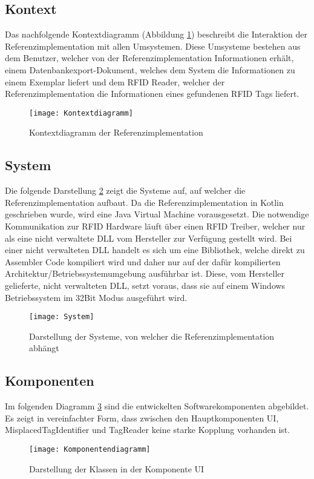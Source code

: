\subsection{Kontext}
Das nachfolgende Kontextdiagramm (Abbildung \ref{fig:Kontextdiagramm}) beschreibt die Interaktion der Referenzimplementation mit allen Umsystemen. Diese Umsysteme bestehen aus dem Benutzer, welcher von der Referenzimplementation Informationen erhält, einem Datenbankexport-Dokument, welches dem System die Informationen zu einem Exemplar liefert und dem RFID Reader, welcher der Referenzimplementation die Informationen eines gefundenen RFID Tags liefert.
\begin{figure}[htb]
	\centering
	\texttt{[image: Kontextdiagramm]}
	\caption{Kontextdiagramm der Referenzimplementation}
	\label{fig:Kontextdiagramm}
\end{figure}

\subsection{System}
Die folgende Darstellung \ref{fig:System} zeigt die Systeme auf, auf welcher die Referenzimplementation aufbaut.
Da die Referenzimplementation in Kotlin geschrieben wurde, wird eine Java Virtual Machine vorausgesetzt. Die notwendige Kommunikation zur RFID Hardware läuft über einen RFID Treiber, welcher nur als eine nicht verwaltete \gls{DLL} vom Hersteller zur Verfügung gestellt wird. Bei einer nicht verwalteten \gls{DLL} handelt es sich um eine Bibliothek, welche direkt zu Assembler Code kompiliert wird und daher nur auf der dafür kompilierten Architektur/Betriebssystemumgebung ausführbar ist. Diese, vom Hersteller gelieferte, nicht verwalteten \gls{DLL}, setzt voraus, dass sie auf einem Windows Betriebssystem im 32Bit Modus ausgeführt wird.
\begin{figure}[htb]
	\centering
	\texttt{[image: System]}
	\caption{Darstellung der Systeme, von welcher die Referenzimplementation abhängt}
	\label{fig:System}
\end{figure}

\subsection{Komponenten}
Im folgenden Diagramm \ref{fig:Components} sind die entwickelten Softwarekomponenten abgebildet. Es zeigt in vereinfachter Form, dass zwischen den Hauptkomponenten UI, MisplacedTagIdentifier und TagReader keine starke Kopplung vorhanden ist.
\begin{figure}[htb]
	\centering
	\texttt{[image: Komponentendiagramm]}
	\caption{Darstellung der Klassen in der Komponente UI}
	\label{fig:Components}
\end{figure}

